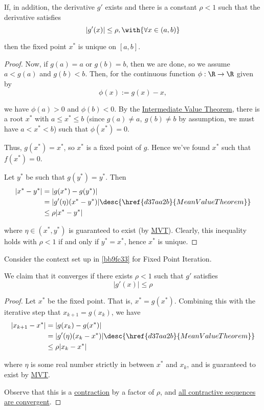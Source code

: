 If, in addition, the derivative $g'$ exists and there is a constant $\rho<1$
such that the derivative satisfies
$$
  |g'(x)|\leq\rho,\with{\forall x\in(a,b)}
$$

then the fixed point $x^*$ is unique on $[a,b]$.

\begin{proof}
   Now, if $g(a)=a$ or $g(b)=b$, then we are done, so we
  assume $a<g(a)$ and $g(b)<b$. Then, for the continuous function $\phi:\R\to\R$
  given by
  $$
    \phi(x):=g(x)-x,
  $$

  we have $\phi(a)>0$ and $\phi(b)<0$. By the \href{d8d9745}{Intermediate Value
  Theorem}, there is a root $x^*$ with $a\leq x^*\leq b$ (since $g(a)\neq a,\
  g(b)\neq b$ by assumption, we must have $a<x^*<b$) such that $\phi(x^*)=0$.

  Thus, $g(x^*)=x^*$, so $x^*$ is a fixed point of $g$. Hence we've found $x^*$
  such that $f(x^*)=0$.

   Let $y^*$ be such that $g(y^*)=y^*$. Then
  \begin{align*}
    |x^*-y^*| &=|g(x^*)-g(y^*)|                                              \\
              &=|g'(\eta)(x^*-y^*)|\desc{\href{d37aa2b}{Mean Value Theorem}} \\
              &\leq\rho|x^*-y^*|
  \end{align*}

  where $\eta\in(x^*,y^*)$ is guaranteed to exist (by \href{d37aa2b}{MVT}).
  Clearly, this inequality holds with $\rho<1$ if and only if $y^*=x^*$, hence
  $x^*$ is unique.
\end{proof}

\label{a27ba27}

Consider the context set up in \autoref{bb9fc33} for Fixed Point Iteration.

We claim that it converges if there exists $\rho<1$ such that $g'$ satisfies
$$
  |g'(x)|\leq\rho
$$

\begin{proof}
  Let $x^*$ be the fixed point. That is, $x^*=g(x^*)$. Combining this with the
  iterative step that $x_{k+1}=g(x_k)$, we have
  \begin{align*}
    |x_{k+1}-x^*| &=|g(x_k)-g(x^*)|                                              \\
                  &=|g'(\eta)(x_k-x^*)|\desc{\href{d37aa2b}{Mean Value Theorem}} \\
                  &\leq\rho|x_k-x^*|
  \end{align*}

  where $\eta$ is some real number strictly in between $x^*$ and $x_k$, and is
  guaranteed to exist by \href{d37aa2b}{MVT}.

  Observe that this is a \href{d5c8fb8}{contraction} by a factor of $\rho$, and
  \href{ac20bfc}{all contractive sequences are convergent}.
\end{proof}

